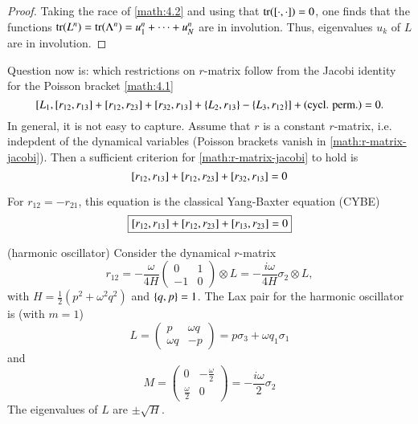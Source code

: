 \begin{proof}
	Taking the race of \eqref{math:4.2} and using that $\tr(\comm{\cdot}{\cdot})=0$, one finds that the functions $\tr(L^n) = \tr(\Lambda^n) = u_1^n + \dots + u_N^n$ are in involution. Thus, eigenvalues $u_k$ of $L$ are in involution.
\end{proof}

Question now is: which restrictions on $r$-matrix follow from the Jacobi identity for the Poisson bracket \eqref{math:4.1}
\begin{equation}
	\comm{L_1}{\comm{r_{12}}{r_{13}} + \comm{r_{12}}{r_{23}} + \comm{r_{32}}{r_{13}} + \pb{L_2}{r_{13}} - \pb{L_3}{r_{12}}  } 
	+ (\text{cycl. perm.})
	= 0.
	\label{math:r-matrix-jacobi}
\end{equation}
In general, it is not easy to capture. Assume that $r$ is a constant $r$-matrix, i.e. indepdent of the dynamical variables (Poisson brackets vanish in \eqref{math:r-matrix-jacobi}). Then a sufficient criterion for \eqref{math:r-matrix-jacobi} to hold is 
\begin{equation}
	\comm{r_{12}}{r_{13}} + \comm{r_{12}}{r_{23}} + \comm{r_{32}}{r_{13}} = 0
\end{equation}

For $r_{12} = - r_{21}$, this equation is the classical Yang-Baxter equation (CYBE)
\begin{equation}
\boxed{%
	\comm{r_{12}}{r_{13}} + \comm{r_{12}}{r_{23}} + \comm{r_{13}}{r_{23}} = 0
}
	\label{math:4.3}
\end{equation}

\begin{example} (harmonic oscillator)
Consider the dynamical $r$-matrix 
\begin{equation*}
	r_{12} = - \frac{\omega}{4H} \begin{pmatrix} 0 & 1 \\ -1 & 0\end{pmatrix} \otimes L = - \frac{i\omega}{4H} \sigma_2 \otimes L,
\end{equation*}
with $H = \frac{1}{2} (p^2 + \omega^2 q^2)$ and $\pb{q}{p} = 1$. The Lax pair for the harmonic oscillator is (with $m=1$)
\begin{equation*}
	L = \begin{pmatrix} p & \omega q \\ \omega q & -p \end{pmatrix} = p\sigma_3 + \omega q_1 \sigma_1
\end{equation*}
and 
\begin{equation*}
	M = \begin{pmatrix} 0 & - \frac{\omega}{2} \\ \frac{\omega}{2} & 0\end{pmatrix} = -\frac{i\omega}{2} \sigma_2
\end{equation*}
The eigenvalues of $L$ are $\pm \sqrt{H}$.
\end{example}

